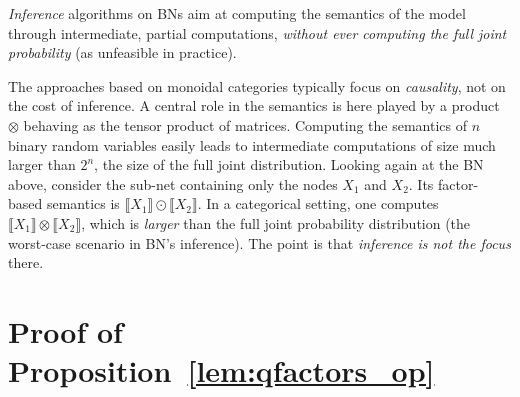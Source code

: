 \documentclass[10pt,a4paper]{article}
\newcommand{\den}[1]{\llbracket{#1}\rrbracket}
\begin{document}
\emph{Inference} algorithms on BNs aim at computing the semantics of the model through intermediate, partial computations, \emph{without ever computing the full joint probability} (as unfeasible in practice).

The approaches based on monoidal categories typically focus on \emph{causality}, not on the cost of inference.
A central role in the semantics is here played by a product $\otimes$ behaving as the tensor product of matrices.
Computing the semantics of $n$ binary random variables easily leads to intermediate computations of size much larger than $2^n$, the size of the full joint distribution.
Looking again at the BN above, consider the sub-net containing only the nodes $X_1$ and $X_2$.
Its factor-based semantics is $\den{X_1} \odot \den{X_2}$.
In a categorical setting, one computes $\den{X_1} \otimes \den{X_2}$, which is \emph{larger} than the full joint probability distribution (the worst-case scenario in BN's inference).
The point is that \emph{inference is not the focus} there.


\section{Proof of Proposition~\texorpdfstring{\ref{lem:qfactors_op}}{18}}
\label{app:section3}
\end{document}
